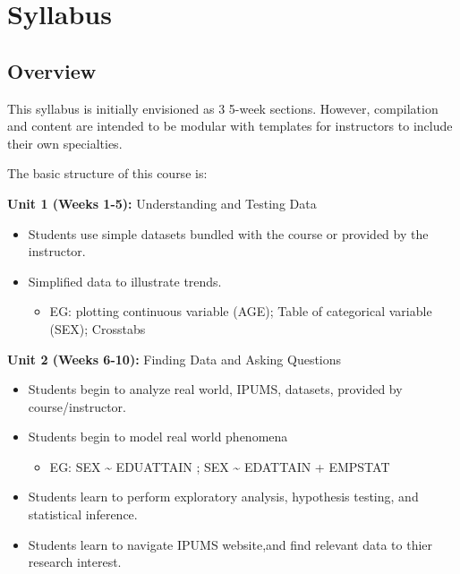 \documentclass[
]{book}
\providecommand{\tightlist}{%
  \setlength{\itemsep}{0pt}\setlength{\parskip}{0pt}}
\begin{document}
\hypertarget{syllabus}{%
\chapter*{Syllabus}\label{syllabus}}

\hypertarget{overview}{%
\section*{Overview}\label{overview}}

This syllabus is initially envisioned as 3 5-week sections. However, compilation and content are intended to be modular with templates for instructors to include their own specialties.

The basic structure of this course is:

\textbf{Unit 1 (Weeks 1-5):} Understanding and Testing Data

\begin{itemize}
\tightlist
\item
  Students use simple datasets bundled with the course or provided by the instructor.
\item
  Simplified data to illustrate trends.

  \begin{itemize}
  \tightlist
  \item
    EG: plotting continuous variable (AGE); Table of categorical variable (SEX); Crosstabs
  \end{itemize}
\end{itemize}

\textbf{Unit 2 (Weeks 6-10):} Finding Data and Asking Questions

\begin{itemize}
\tightlist
\item
  Students begin to analyze real world, IPUMS, datasets, provided by course/instructor.
\item
  Students begin to model real world phenomena

  \begin{itemize}
  \tightlist
  \item
    EG: SEX \textasciitilde{} EDUATTAIN ; SEX \textasciitilde{} EDATTAIN + EMPSTAT
  \end{itemize}
\item
  Students learn to perform exploratory analysis, hypothesis testing, and statistical inference.
\item
  Students learn to navigate IPUMS website,and find relevant data to thier research interest.
\end{itemize}
\end{document}
